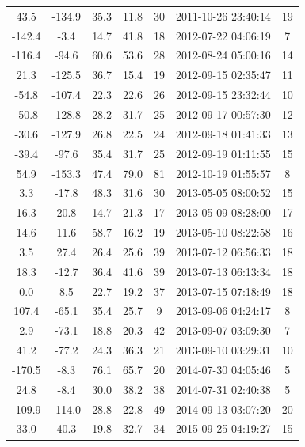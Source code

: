 \documentclass[12pt,a4paper]{report}
\begin{document}
\begin{longtable}{|c|c|c|c|c|c|c|}
43.5 & -134.9 & 35.3 & 11.8 &  30 & 2011-10-26 23:40:14 &  19 \\
-142.4 & -3.4 & 14.7 & 41.8 &  18 & 2012-07-22 04:06:19 &   7 \\
-116.4 & -94.6 & 60.6 & 53.6 &  28 & 2012-08-24 05:00:16 &  14 \\
21.3 & -125.5 & 36.7 & 15.4 &  19 & 2012-09-15 02:35:47 &  11 \\
-54.8 & -107.4 & 22.3 & 22.6 &  26 & 2012-09-15 23:32:44 &  10 \\
-50.8 & -128.8 & 28.2 & 31.7 &  25 & 2012-09-17 00:57:30 &  12 \\
-30.6 & -127.9 & 26.8 & 22.5 &  24 & 2012-09-18 01:41:33 &  13 \\
-39.4 & -97.6 & 35.4 & 31.7 &  25 & 2012-09-19 01:11:55 &  15 \\
54.9 & -153.3 & 47.4 & 79.0 &  81 & 2012-10-19 01:55:57 &   8 \\
3.3 & -17.8 & 48.3 & 31.6 &  30 & 2013-05-05 08:00:52 &  15 \\
16.3 & 20.8 & 14.7 & 21.3 &  17 & 2013-05-09 08:28:00 &  17 \\
14.6 & 11.6 & 58.7 & 16.2 &  19 & 2013-05-10 08:22:58 &  16 \\
3.5 & 27.4 & 26.4 & 25.6 &  39 & 2013-07-12 06:56:33 &  18 \\
18.3 & -12.7 & 36.4 & 41.6 &  39 & 2013-07-13 06:13:34 &  18 \\
0.0 & 8.5 & 22.7 & 19.2 &  37 & 2013-07-15 07:18:49 &  18 \\
107.4 & -65.1 & 35.4 & 25.7 &   9 & 2013-09-06 04:24:17 &   8 \\
2.9 & -73.1 & 18.8 & 20.3 &  42 & 2013-09-07 03:09:30 &   7 \\
41.2 & -77.2 & 24.3 & 36.3 &  21 & 2013-09-10 03:29:31 &  10 \\
-170.5 & -8.3 & 76.1 & 65.7 &  20 & 2014-07-30 04:05:46 &   5 \\
24.8 & -8.4 & 30.0 & 38.2 &  38 & 2014-07-31 02:40:38 &   5 \\
-109.9 & -114.0 & 28.8 & 22.8 &  49 & 2014-09-13 03:07:20 &  20 \\
33.0 & 40.3 & 19.8 & 32.7 &  34 & 2015-09-25 04:19:27 &  15 \\
\hline
\end{longtable}
\end{document}
